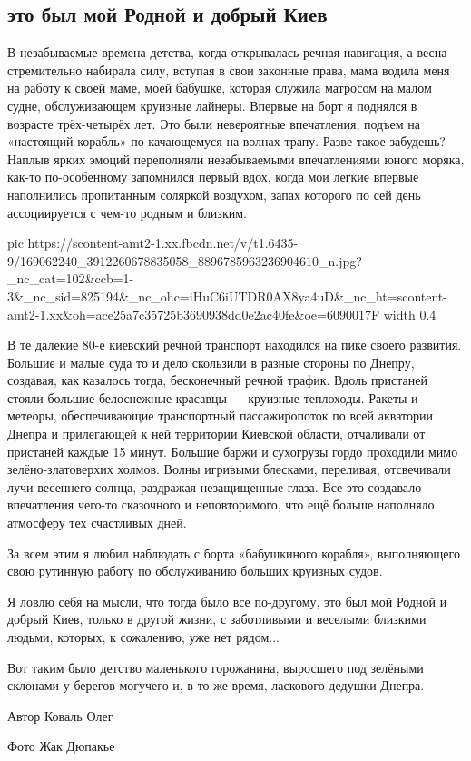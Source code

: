  
 
 
 
 

\subsection{это был мой Родной и добрый Киев}

В незабываемые времена детства, когда открывалась речная навигация, а весна
стремительно набирала силу, вступая в свои законные права, мама водила меня на
работу к своей маме, моей бабушке, которая служила матросом на малом судне,
обслуживающем круизные лайнеры. Впервые на борт я поднялся в возрасте
трёх-четырёх лет. Это были невероятные впечатления, подъем на «настоящий
корабль» по качающемуся на волнах трапу. Разве такое забудешь? Наплыв ярких
эмоций переполняли незабываемыми впечатлениями юного моряка, как-то
по-особенному запомнился первый вдох, когда мои легкие впервые наполнились
пропитанным соляркой воздухом, запах которого по сей день ассоциируется с
чем-то родным и близким. 

\ifcmt
  pic https://scontent-amt2-1.xx.fbcdn.net/v/t1.6435-9/169062240_3912260678835058_8896785963236904610_n.jpg?_nc_cat=102&ccb=1-3&_nc_sid=825194&_nc_ohc=iHuC6iUTDR0AX8ya4uD&_nc_ht=scontent-amt2-1.xx&oh=ace25a7c35725b3690938dd0e2ac40fe&oe=6090017F
  width 0.4
\fi

В те далекие 80-е киевский речной транспорт находился на пике своего развития.
Большие и малые суда то и дело скользили в разные стороны по Днепру, создавая,
как казалось тогда, бесконечный речной трафик. Вдоль пристаней стояли большие
белоснежные красавцы — круизные теплоходы. Ракеты и метеоры, обеспечивающие
транспортный пассажиропоток по всей акватории Днепра и прилегающей к ней
территории Киевской области, отчаливали от пристаней каждые 15 минут. Большие
баржи и сухогрузы гордо проходили мимо зелёно-златоверхих холмов. Волны
игривыми блесками, переливая, отсвечивали лучи весеннего солнца, раздражая
незащищенные глаза. Все это создавало впечатления чего-то сказочного и
неповторимого, что ещё больше наполняло атмосферу тех счастливых дней.

За всем этим я любил наблюдать с борта «бабушкиного корабля», выполняющего свою
рутинную работу по обслуживанию больших круизных судов.

Я ловлю себя на мысли, что тогда было все по-другому, это был мой Родной и
добрый Киев, только в другой жизни, с заботливыми и веселыми близкими людьми,
которых, к сожалению, уже нет рядом...

Вот таким было детство маленького горожанина, выросшего под зелёными склонами у
берегов могучего и, в то же время, ласкового дедушки Днепра.

Автор Коваль Олег

Фото Жак Дюпакье


